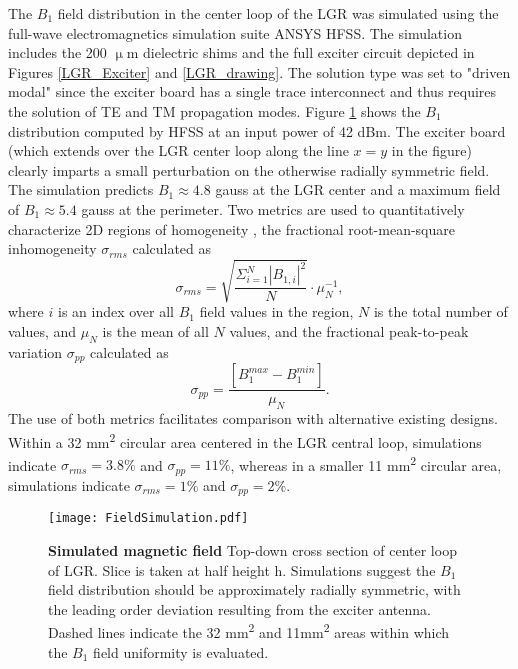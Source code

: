 The $B_1$ field distribution in the center loop of the LGR was simulated using the full-wave electromagnetics simulation suite ANSYS HFSS. The simulation includes the 200 $\upmu$m dielectric shims and the full exciter circuit depicted in Figures \ref{LGR_Exciter} and \ref{LGR_drawing}. The solution type was set to "driven modal" since the exciter board has a single trace interconnect and thus requires the solution of TE and TM propagation modes. Figure \ref{LGR_simulated} shows the $B_1$ distribution computed by HFSS at an input power of 42 dBm. The exciter board (which extends over the LGR center loop along the line $x = y$ in the figure) clearly imparts a small perturbation on the otherwise radially symmetric field. The simulation predicts $B_1 \approx 4.8$ gauss at the LGR center and a maximum field of $B_1 \approx 5.4$ gauss at the perimeter. Two metrics are used to quantitatively characterize 2D regions of homogeneity , the fractional root-mean-square inhomogeneity $\sigma_{rms}$ calculated as 
\begin{equation}\label{sigma_rms}
\sigma_{rms} = \sqrt{\frac{\Sigma_{i = 1}^N|B_{1,i}|^2}{N}} \cdot \mu_N^{-1},
\end{equation}
where $i$ is an index over all $B_1$ field values in the region, $N$ is the total number of values, and $\mu_N$ is the mean of all $N$ values, and the fractional peak-to-peak variation $\sigma_{pp}$ calculated as
\begin{equation}\label{sigma_pp}
\sigma_{pp} = \frac{\left[B_1^{max} - B_1^{min}\right]}{\mu_N}.
\end{equation} 
The use of both metrics facilitates comparison with alternative existing designs. Within a 32 mm\textsuperscript{2} circular area centered in the LGR central loop, simulations indicate $\sigma_{rms} = 3.8\%$ and $\sigma_{pp} = 11\%$, whereas in a smaller 11 mm\textsuperscript{2} circular area, simulations indicate $\sigma_{rms} = 1\%$ and $\sigma_{pp} = 2\%$.

\begin{figure}[t!]
\centering
\texttt{[image: FieldSimulation.pdf]}  
\caption{\textbf{Simulated magnetic field} Top-down cross section of center loop of LGR. Slice is taken at half height h. Simulations suggest the $B_1$ field distribution
should be approximately radially symmetric, with the leading order deviation resulting from the exciter antenna. Dashed lines indicate the 32 mm\textsuperscript{2} and 11mm\textsuperscript{2} areas within which the $B_1$ field uniformity is evaluated.}
\label{LGR_simulated}
\end{figure}

